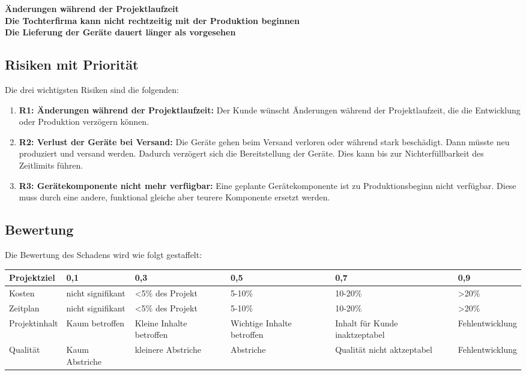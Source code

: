 \textbf{Änderungen während der Projektlaufzeit}\\
\textbf{Die Tochterfirma kann nicht rechtzeitig mit der Produktion beginnen}\\
\textbf{Die Lieferung der Geräte dauert länger als vorgesehen}

\subsection{Risiken mit Priorität} %

Die drei wichtigsten Risiken sind die folgenden:
\begin{enumerate}
	\item \textbf{R1: Änderungen während der Projektlaufzeit:} Der Kunde wünscht Änderungen während der Projektlaufzeit, die die Entwicklung oder Produktion verzögern können.
 	\item \textbf{R2: Verlust der Geräte bei Versand:} Die Geräte gehen beim Versand verloren oder während stark beschädigt. Dann müsste neu produziert und versand werden. Dadurch verzögert sich die Bereitstellung der Geräte. Dies kann bis zur Nichterfüllbarkeit des Zeitlimits führen.
	\item \textbf{R3: Gerätekomponente nicht mehr verfügbar:} Eine geplante Gerätekomponente ist zu Produktionsbeginn nicht verfügbar. Diese muss durch eine andere, funktional gleiche aber teurere Komponente ersetzt werden.
\end{enumerate}


\subsection{Bewertung }
Die Bewertung des Schadens wird wie folgt gestaffelt:	
\begin{table}[H]
	    \renewcommand{\arraystretch}{1.2}
	\begin{center}
	\begin{tabular}{p{2.2cm}|p{2cm}|p{2cm}|p{2cm}|p{2cm}|l}
		
		Projektziel & 0,1 & 0,3 & 0,5 & 0,7 & 0,9 \\\hline
		Kosten & nicht signifikant & \textless{}5\% des Projekt & 5-10\% & 10-20\% & \textgreater{}20\% \\\hline
		Zeitplan & nicht signifikant & \textless{}5\% des Projekt & 5-10\% & 10-20\% & \textgreater{}20\% \\\hline
		Projektinhalt & Kaum betroffen & Kleine Inhalte betroffen & Wichtige Inhalte betroffen & Inhalt für Kunde inaktzeptabel & Fehlentwicklung \\\hline
		Qualität & Kaum Abstriche & kleinere Abstriche & Abstriche & Qualität nicht aktzeptabel & Fehlentwicklung
	\end{tabular}
\end{center}
\end{table}

